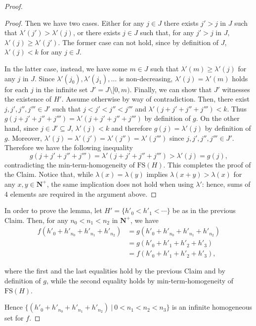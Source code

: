 \documentclass[a4paper,11pt]{article}
\newcommand\Nat{\mathbf{N}}
\newcommand\FS{\mathrm{FS}}
\newcommand\lambdam{\lambda'}
\begin{document}
\begin{proof}
\begin{proof}
Then we have two cases. Either for any $j \in J$ there exists $j'>j$ in $J$ such that $\lambdam(j')>\lambdam(j)$, or there exists $j \in J$ such that, for any $j'>j$ in $J$, $\lambdam(j) \geq \lambdam(j')$.
The former case can not hold, since by definition of $J$, $\lambdam(j)<k$ for any $j \in J$.

In the latter case, instead, we have some $m \in J$ such that $\lambdam(m) \geq \lambdam(j)$ for any $j$ in $J$. Since $\lambdam(j_0), \lambdam(j_1), \ldots$ is non-decreasing, $\lambdam(j) = \lambdam(m)$ holds for each $j$ in the infinite set $J' = J \setminus [0,m)$. Finally, we can show that $J'$ witnesses the existence of $H'$. Assume otherwise by way of contradiction. Then, there exist $j,j',j'',j''' \in J'$ such that $j<j'<j''<j'''$ and $\lambda'(j+j'+j''+j''')<k$. Thus $g(j+j'+j''+j''') = \lambdam(j+j'+j''+j''')$ by definition of $g$. On the other hand, since $j\in J'\subseteq J$, $\lambdam(j)<k$ and therefore $g(j) = \lambdam(j)$ by definition of $g$. Moreover, $\lambdam(j)=\lambdam(j')=\lambdam(j'')=\lambdam(j''')$ since $j,j',j'',j'''\in J'$. Therefore we have the following inequality 
$$g(j+j'+j''+j''') = \lambdam(j+j'+j''+j''') > \lambdam(j) = g(j),$$
contradicting the min-term-homogeneity of $\FS(H)$. This completes the proof of the Claim. Notice that, while  $\lambda(x)=\lambda(y)$ implies $\lambda(x+y)>\lambda(x)$ for any $x,y \in \Nat^+$, the same implication does not hold when using $\lambdam$: hence, sums of 4 elements are required in the argument above.
\end{proof}

In order to prove the lemma, let $H' = \{h'_0 < h'_1 < \cdots\}$ be as in the previous Claim. Then, for any $n_0 < n_1 < n_2$ in $\Nat^+$, we have
\begin{equation*}
\begin{split}
f(h'_0 + h'_{n_0} + h'_{n_1} + h'_{n_2}) & = g(h'_0 + h'_{n_0} + h'_{n_1} + h'_{n_2})\\
 & = g(h'_0 + h'_1 + h'_2 + h'_3) \\ 
 & = f(h'_0 + h'_1 + h'_2 + h'_3),
\end{split}
\end{equation*}

where the first and the last equalities hold by the previous Claim and by definition of $g$, while the second equality holds by min-term-homogeneity of $\FS(H)$.

Hence $\{(h'_0 + h'_{n_0} + h'_{n_1} + h'_{n_2}) \ |\ 0 < n_1 < n_2 < n_3\}$ is an infinite homogeneous set for $f$.
\end{proof}
\end{document}
